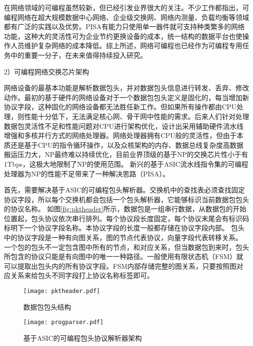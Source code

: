 在网络领域的可编程虽然较新，但已经引发业界很大的关注。不少工作都指出，可编程网络在超大规模数据中心网络、企业级交换网、网络内测量、负载均衡等领域都有广泛的实践以及优势。PISA有能力只使用单一器件就可支持种类繁多的网络功能，这种大的灵活性可为企业节约更换设备的成本，统一结构的数据平台也使操作人员维护复杂网络的成本降低。综上所述，网络可编程也已经作为可编程专用任务中的重要一分子，在未来值得持续投入研究。

2）可编程网络交换芯片架构

网络设备的最基本功能是解析数据包头，并对数据包头信息进行转发、丢弃、修改动作。最初的基于硬件的网络设备对于一个数据包包头定义是固化的，每当增加新协议字段，这种固化的网络设备都无法胜任新工作。但如果所有操作都由CPU处理，则性能十分低下，无法满足核心网、骨干网中性能的需求。后来人们针对处理数据包灵活性不足和性能问题对CPU进行架构优化，设计出采用辅助硬件流水线增强和多核并行方式的网络处理器。网络处理器拥有CPU般的灵活性，但由于本质还是基于CPU的指令循环操作，以及众核架构的内存、数据总线复杂度高数据搬运压力大，NP最终难以持续优化，目前业界顶级的基于NP的交换芯片性小于有1Tbps，这极大地限制了NP的使用范围。
新兴的基于ASIC流水线指令集的可编程处理器为NP的性能不足带来了一种解决思路（PISA）。

首先，需要解决基于ASIC的可编程包头解析器。交换机中的查找表必须查找固定协议字段，所以每个交换机都会包括一个包头解析器，它能够标识当前数据包包头的协议名称。
如图\ref{fig:pktheader}所示，数据包是一组串行数据，从数据包的开始位置起，包头协议依次串行排列。每个协议段长度固定，每个协议末尾会有标识码标明下一个协议字段名称。本协议字段的长度一般都存储在协议字段内部。
包头中的协议字段是一种有向图关系，图的节点代表协议，向量字段代表转移关系。
一个包的包头不一定包含图中所有的节点，和对应关系，但当数据包到来时，包头所包含的协议只能是有向图中的唯一一种路径。一般使用有限状态机（FSM）就可以提取出包头内的所有协议字段。FSM内部存储完整的图关系，只要按照图对应关系来给包头不同字段打上协议名称标签即可。

\begin{figure}[htbp]
	\centering
	\begin{minipage}[t]{0.48\textwidth}
		\centering
		\texttt{[image: pktheader.pdf]}
		\caption{数据包包头结构} \label{fig:pktheader}
	\end{minipage}
	\begin{minipage}[t]{0.48\textwidth}
		\centering
		\texttt{[image: progparser.pdf]}
		\caption{基于ASIC的可编程包头协议解析器架构} \label{fig:progparser}
	\end{minipage}
\end{figure}


